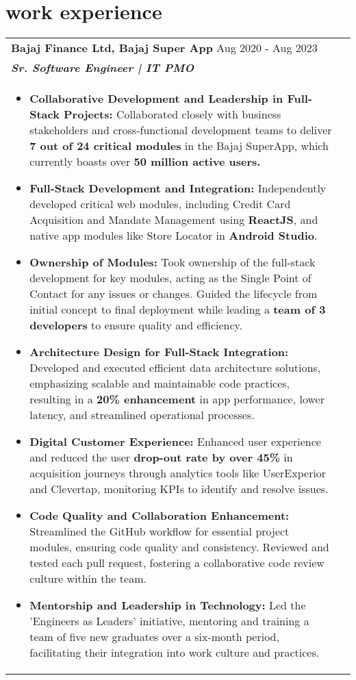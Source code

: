\documentclass[a4paper,8pt]{article}
\begin{document}
\section{work experience}
\begin{tabularx}{\linewidth}{ @{}l r@{} }
\textbf{{Bajaj Finance Ltd, Bajaj Super App}} \hfill \color[HTML]{371e77} Aug 2020 - Aug 2023 \\[4pt]
\color[HTML]{371e77}\textbf{\textit{Sr. Software Engineer | IT PMO}} \color[HTML]{4B28A4} \\[5pt]
\begin{minipage}[t]{\linewidth}
\begin{itemize}[nosep,after=\strut, leftmargin=2em, itemsep=2pt]
    \item \textbf{Collaborative Development and Leadership in Full-Stack Projects:} Collaborated closely with business stakeholders and cross-functional development teams to deliver \textbf{7 out of 24 critical modules} in the Bajaj SuperApp, which currently boasts over \textbf{50 million active users.}
    \item \textbf{Full-Stack Development and Integration:} Independently developed critical web modules, including Credit Card Acquisition and Mandate Management using \textbf{ReactJS}, and native app modules like Store Locator in \textbf{Android Studio}.
    \item \textbf{Ownership of Modules:} Took ownership of the full-stack development for key modules, acting as the Single Point of Contact for any issues or changes. Guided the lifecycle from initial concept to final deployment while leading a \textbf{team of 3 developers} to ensure quality and efficiency.
    \item \textbf{Architecture Design for Full-Stack Integration:} Developed and executed efficient data architecture solutions, emphasizing scalable and maintainable code practices, resulting in a \textbf{20\% enhancement} in app performance, lower latency, and streamlined operational processes.
    \item \textbf{Digital Customer Experience:} Enhanced user experience and reduced the user \textbf{drop-out rate by over 45\%} in acquisition journeys through analytics tools like UserExperior and Clevertap, monitoring KPIs to identify and resolve issues.
    \item \textbf{Code Quality and Collaboration Enhancement:} Streamlined the GitHub workflow for essential project modules, ensuring code quality and consistency. Reviewed and tested each pull request, fostering a collaborative code review culture within the team.
    \item \textbf{Mentorship and Leadership in Technology:} Led the 'Engineers as Leaders' initiative, mentoring and training a team of five new graduates over a six-month period, facilitating their integration into work culture and practices.
\end{itemize}

\end{minipage}
\end{tabularx}
\end{document}
